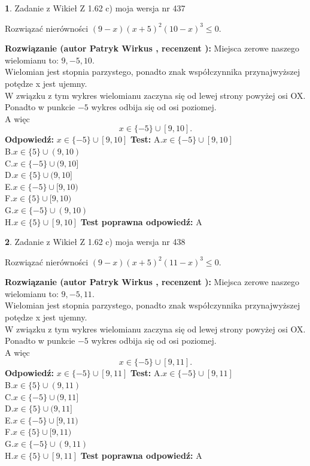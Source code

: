 \documentclass[12pt, a4paper]{article}
\theoremstyle{definition} %
\newtheorem{zad}{}
\newcommand{\zadStart}[1]{\begin{zad}#1\newline}
\newcommand{\zadStop}{\end{zad}}
\newcommand{\rozwStart}[2]{\noindent \textbf{Rozwiązanie (autor #1 , recenzent #2): }\newline}
\newcommand{\rozwStop}{\newline}
\newcommand{\odpStart}{\noindent \textbf{Odpowiedź:}\newline}
\newcommand{\odpStop}{\newline}
\newcommand{\testStart}{\noindent \textbf{Test:}\newline}
\newcommand{\testStop}{\newline}
\newcommand{\kluczStart}{\noindent \textbf{Test poprawna odpowiedź:}\newline}
\newcommand{\kluczStop}{\newline}
\begin{document}
\zadStart{Zadanie z Wikieł Z 1.62 c) moja wersja nr 437}

Rozwiązać nierówności $(9-x)(x+5)^{2}(10-x)^{3}\le0$.
\zadStop
\rozwStart{Patryk Wirkus}{}
Miejsca zerowe naszego wielomianu to: $9, -5, 10$.\\
Wielomian jest stopnia parzystego, ponadto znak współczynnika przy\linebreak najwyższej potędze x jest ujemny.\\ W związku z tym wykres wielomianu zaczyna się od lewej strony powyżej osi OX.\\
Ponadto w punkcie $-5$ wykres odbija się od osi poziomej.\\
A więc $$x \in \{-5\} \cup [9,10].$$
\rozwStop
\odpStart
$x \in \{-5\} \cup [9,10]$
\odpStop
\testStart
A.$x \in \{-5\} \cup [9,10]$\\
B.$x \in \{5\} \cup (9,10)$\\
C.$x \in \{-5\} \cup (9,10]$\\
D.$x \in \{5\} \cup (9,10]$\\
E.$x \in \{-5\} \cup [9,10)$\\
F.$x \in \{5\} \cup [9,10)$\\
G.$x \in \{-5\} \cup (9,10)$\\
H.$x \in \{5\} \cup [9,10]$
\testStop
\kluczStart
A
\kluczStop



\zadStart{Zadanie z Wikieł Z 1.62 c) moja wersja nr 438}

Rozwiązać nierówności $(9-x)(x+5)^{2}(11-x)^{3}\le0$.
\zadStop
\rozwStart{Patryk Wirkus}{}
Miejsca zerowe naszego wielomianu to: $9, -5, 11$.\\
Wielomian jest stopnia parzystego, ponadto znak współczynnika przy\linebreak najwyższej potędze x jest ujemny.\\ W związku z tym wykres wielomianu zaczyna się od lewej strony powyżej osi OX.\\
Ponadto w punkcie $-5$ wykres odbija się od osi poziomej.\\
A więc $$x \in \{-5\} \cup [9,11].$$
\rozwStop
\odpStart
$x \in \{-5\} \cup [9,11]$
\odpStop
\testStart
A.$x \in \{-5\} \cup [9,11]$\\
B.$x \in \{5\} \cup (9,11)$\\
C.$x \in \{-5\} \cup (9,11]$\\
D.$x \in \{5\} \cup (9,11]$\\
E.$x \in \{-5\} \cup [9,11)$\\
F.$x \in \{5\} \cup [9,11)$\\
G.$x \in \{-5\} \cup (9,11)$\\
H.$x \in \{5\} \cup [9,11]$
\testStop
\kluczStart
A
\kluczStop
\end{document}
